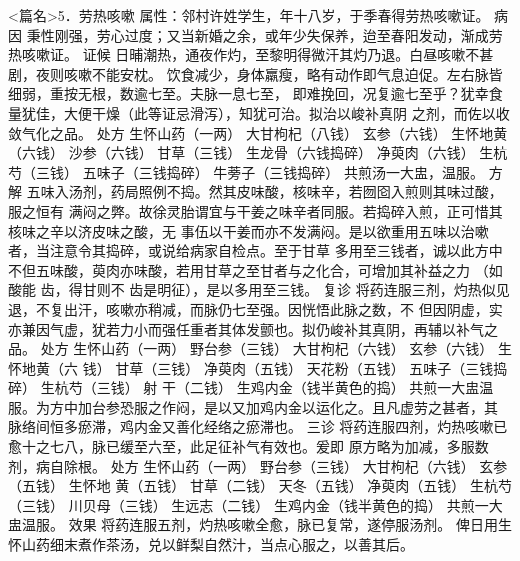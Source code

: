 \documentclass[a4paper,12pt,UTF8,twoside]{ctexbook}
\begin{document}
<篇名>5．劳热咳嗽
属性：邻村许姓学生，年十八岁，于季春得劳热咳嗽证。 
病因 秉性刚强，劳心过度；又当新婚之余，或年少失保养，迨至春阳发动，渐成劳热咳嗽证。 
证候 日晡潮热，通夜作灼，至黎明得微汗其灼乃退。白昼咳嗽不甚剧，夜则咳嗽不能安枕。 
饮食减少，身体羸瘦，略有动作即气息迫促。左右脉皆细弱，重按无根，数逾七至。夫脉一息七至， 
即难挽回，况复逾七至乎？犹幸食量犹佳，大便干燥（此等证忌滑泻），知犹可治。拟治以峻补真阴 
之剂，而佐以收 
敛气化之品。 
处方 生怀山药（一两） 大甘枸杞（八钱） 玄参（六钱） 生怀地黄（六钱） 沙参（六钱） 
甘草（三钱） 生龙骨（六钱捣碎） 净萸肉（六钱） 生杭芍（三钱） 五味子（三钱捣碎） 牛蒡子（三钱捣碎） 
共煎汤一大盅，温服。 
方解 五味入汤剂，药局照例不捣。然其皮味酸，核味辛，若囫囵入煎则其味过酸，服之恒有 
满闷之弊。故徐灵胎谓宜与干姜之味辛者同服。若捣碎入煎，正可惜其核味之辛以济皮味之酸，无 
事伍以干姜而亦不发满闷。是以欲重用五味以治嗽者，当注意令其捣碎，或说给病家自检点。至于甘草 
多用至三钱者，诚以此方中不但五味酸，萸肉亦味酸，若用甘草之至甘者与之化合，可增加其补益之力 
（如酸能 齿，得甘则不 齿是明征），是以多用至三钱。 
复诊 将药连服三剂，灼热似见退，不复出汗，咳嗽亦稍减，而脉仍七至强。因恍悟此脉之数，不 
但因阴虚，实亦兼因气虚，犹若力小而强任重者其体发颤也。拟仍峻补其真阴，再辅以补气之品。 
处方 生怀山药（一两） 野台参（三钱） 大甘枸杞（六钱） 玄参（六钱） 生怀地黄（六 
钱） 甘草（三钱） 净萸肉（五钱） 天花粉（五钱） 五味子（三钱捣碎） 生杭芍（三钱） 射 
干（二钱） 生鸡内金（钱半黄色的捣） 
共煎一大盅温服。为方中加台参恐服之作闷，是以又加鸡内金以运化之。且凡虚劳之甚者，其 
脉络间恒多瘀滞，鸡内金又善化经络之瘀滞也。 
三诊 将药连服四剂，灼热咳嗽已愈十之七八，脉已缓至六至，此足征补气有效也。爰即 
原方略为加减，多服数剂，病自除根。 
处方 生怀山药（一两） 野台参（三钱） 大甘枸杞（六钱） 玄参（五钱） 生怀地 
黄（五钱） 甘草（二钱） 天冬（五钱） 净萸肉（五钱） 生杭芍（三钱） 川贝母（三钱） 
生远志（二钱） 生鸡内金（钱半黄色的捣） 
共煎一大盅温服。 
效果 将药连服五剂，灼热咳嗽全愈，脉已复常，遂停服汤剂。 
俾日用生怀山药细末煮作茶汤，兑以鲜梨自然汁，当点心服之，以善其后。 
\end{document}
